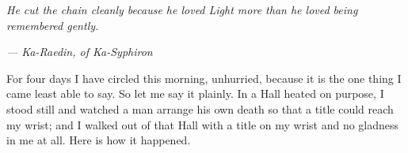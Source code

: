 
\textit{He cut the chain cleanly because he loved Light more than he loved being remembered gently.}\par
\textit{--- Ka-Raedin, of Ka-Syphiron}\par

\ornament


For four days I have circled this morning, unhurried, because it is the one thing I came least able to say. So let me say it plainly. In a Hall heated on purpose, I stood still and watched a man arrange his own death so that a title could reach my wrist; and I walked out of that Hall with a title on my wrist and no gladness in me at all. Here is how it happened.\par

